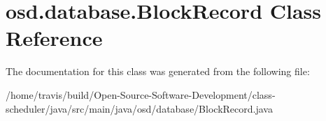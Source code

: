 \hypertarget{classosd_1_1database_1_1_block_record}{\section{osd.\-database.\-Block\-Record Class Reference}
\label{classosd_1_1database_1_1_block_record}
}


The documentation for this class was generated from the following file\-:\begin{DoxyCompactItemize}
\item 
/home/travis/build/\-Open-\/\-Source-\/\-Software-\/\-Development/class-\/scheduler/java/src/main/java/osd/database/Block\-Record.\-java\end{DoxyCompactItemize}
